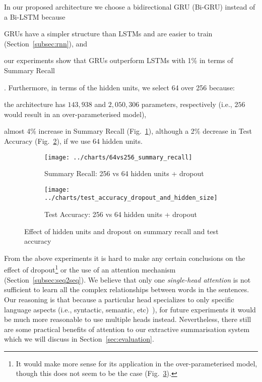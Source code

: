 In our proposed architecture we choose a bidirectional GRU (Bi-GRU) instead of a Bi-LSTM because
\begin{enumerate*}
    \item GRUs have a simpler structure than LSTMs and are easier to train (Section~\ref{subsec:rnn}), and
    \item our experiments show that GRUs outperform LSTMs with 1\% in terms of Summary Recall
\end{enumerate*}.
Furthermore, in terms of the hidden units, we select 64 over 256 because:
\begin{enumerate*}
    \item the architecture has $143,938$ and $2,050,306$ parameters, respectively (i.e., $256$ would result in an over-parameterised model),
    \item almost 4\% increase in Summary Recall (Fig.~\ref{fig:64vs256_summary_recall}),
    although a 2\% decrease in Test Accuracy (Fig.~\ref{fig:test_accuracy_dropout_and_hidden_size}), if we use $64$ hidden units.
\end{enumerate*}
\begin{figure}[ht]
    \begin{subfigure}{0.49\textwidth}
        \centering \texttt{[image: ../charts/64vs256\_summary\_recall]}
        \caption{Summary Recall: 256 vs 64 hidden units + dropout}
        \label{fig:64vs256_summary_recall}
    \end{subfigure}%
    \hfill
    \begin{subfigure}{0.49\textwidth}
        \centering
        \texttt{[image: ../charts/test\_accuracy\_dropout\_and\_hidden\_size]}
        \caption{Test Accuracy: 256 vs 64 hidden units + dropout}
        \label{fig:test_accuracy_dropout_and_hidden_size}
    \end{subfigure}
    \caption{Effect of hidden units and dropout on summary recall and test accuracy}
    \label{fig:dropout_and_hidden_size}
\end{figure}

From the above experiments it is hard to make any certain conclusions on the effect of dropout\footnote{
    It would make more sense for its application in the over-parameterised model, though this does not seem to be the case (Fig.~\ref{fig:dropout_and_hidden_size}).
} or the use of an attention mechanism (Section~\ref{subsec:seq2seq}).
We believe that only one \emph{single-head attention} is not sufficient to learn all the complex relationships between words in the sentences.
Our reasoning is that because a particular head specializes to only specific language aspects (i.e., syntactic, semantic, etc)~\cite{clark-etal-2019-bert}),
for future experiments it would be much more reasonable to use multiple heads instead.
Nevertheless, there still are some practical benefits of attention to our extractive summarisation system which we will discuss in Section~\ref{sec:evaluation}.

